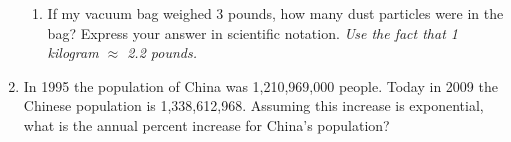 \documentclass[12pt]{article}
\begin{document}
\begin{enumerate}
\begin{enumerate}
\item If my vacuum bag weighed 3 pounds, how many dust particles were in the bag? Express your answer in scientific notation.  \emph{Use the fact that 1 kilogram $\approx$ 2.2 pounds.}
\vfill
\end{enumerate}

\item In 1995 the population of China was 1,210,969,000 people.  Today in 2009 the Chinese population is 1,338,612,968.  Assuming this increase is exponential, what is the annual percent increase for China's population?
\vfill
\end{enumerate}
\end{document}
